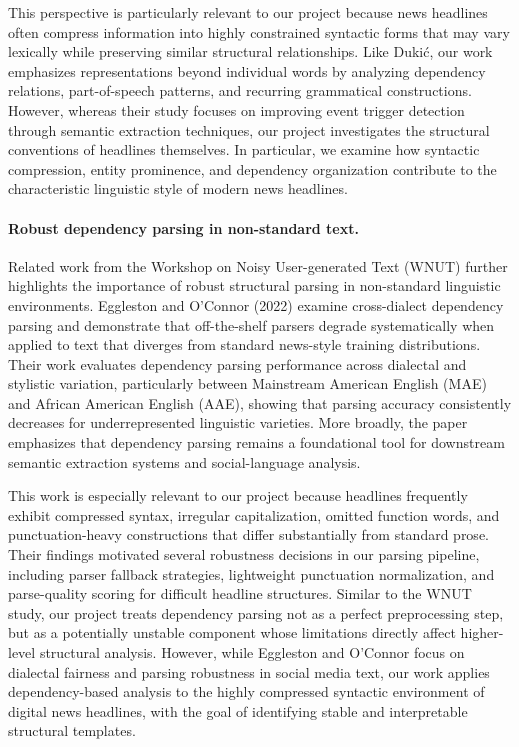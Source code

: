 \documentclass[11pt]{article}
\begin{document}
This perspective is particularly relevant to our project because news headlines often compress information into highly constrained syntactic forms that may vary lexically while preserving similar structural relationships. Like Dukić, our work emphasizes representations beyond individual words by analyzing dependency relations, part-of-speech patterns, and recurring grammatical constructions. However, whereas their study focuses on improving event trigger detection through semantic extraction techniques, our project investigates the structural conventions of headlines themselves. In particular, we examine how syntactic compression, entity prominence, and dependency organization contribute to the characteristic linguistic style of modern news headlines.

\paragraph{Robust dependency parsing in non-standard text.} Related work from the Workshop on Noisy User-generated Text (WNUT) further highlights the importance of robust structural parsing in non-standard linguistic environments. Eggleston and O’Connor (2022) examine cross-dialect dependency parsing and demonstrate that off-the-shelf parsers degrade systematically when applied to text that diverges from standard news-style training distributions. Their work evaluates dependency parsing performance across dialectal and stylistic variation, particularly between Mainstream American English (MAE) and African American English (AAE), showing that parsing accuracy consistently decreases for underrepresented linguistic varieties. More broadly, the paper emphasizes that dependency parsing remains a foundational tool for downstream semantic extraction systems and social-language analysis.

This work is especially relevant to our project because headlines frequently exhibit compressed syntax, irregular capitalization, omitted function words, and punctuation-heavy constructions that differ substantially from standard prose. Their findings motivated several robustness decisions in our parsing pipeline, including parser fallback strategies, lightweight punctuation normalization, and parse-quality scoring for difficult headline structures. Similar to the WNUT study, our project treats dependency parsing not as a perfect preprocessing step, but as a potentially unstable component whose limitations directly affect higher-level structural analysis. However, while Eggleston and O’Connor focus on dialectal fairness and parsing robustness in social media text, our work applies dependency-based analysis to the highly compressed syntactic environment of digital news headlines, with the goal of identifying stable and interpretable structural templates.
\end{document}
